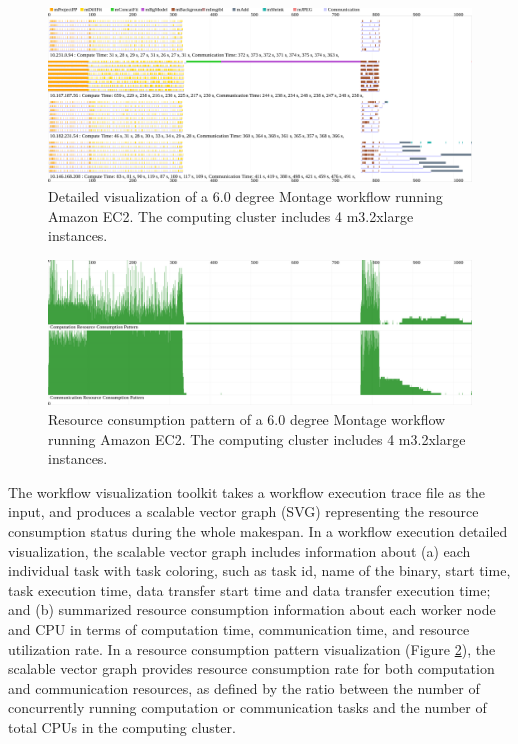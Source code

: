 \begin{figure}[ht]
\centering
\includegraphics[width=16cm]{visual}
\caption{Detailed visualization of a 6.0 degree Montage workflow running Amazon EC2. The computing cluster includes 4 m3.2xlarge instances.}
\label{fig:detail}
\end{figure}

\begin{figure}[ht]
\centering
\includegraphics[width=16cm]{pattern}
\caption{Resource consumption pattern of a 6.0 degree Montage workflow running Amazon EC2. The computing cluster includes 4 m3.2xlarge instances.}
\label{fig:pattern}
\end{figure}



The workflow visualization toolkit takes a workflow execution trace file as the input, and produces a scalable vector graph (SVG) representing the resource consumption status during the whole makespan. In a workflow execution detailed visualization, the scalable vector graph includes information about (a) each individual task with task coloring, such as task id, name of the binary, start time, task execution time, data transfer start time and data transfer execution time; and (b) summarized resource consumption information about each worker node and CPU in terms of computation time, communication time, and resource utilization rate. In a resource consumption pattern visualization (Figure \ref{fig:pattern}), the scalable vector graph provides resource consumption rate for both computation and communication resources, as defined by the ratio between the number of concurrently running computation or communication tasks and the number of total CPUs in the computing cluster.

